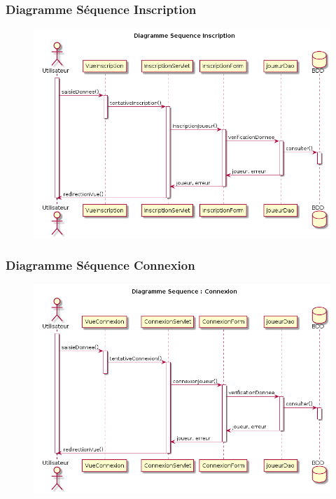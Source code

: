 \begin{frame}
    \frametitle{Diagramme Séquence Inscription}
    \begin{figure}
		\includegraphics[scale=0.3]{images/DiagrammeSequenceInscription.png}
	\end{figure}

\end{frame}

\begin{frame}
    \frametitle{Diagramme Séquence Connexion}
    \begin{figure}
		\includegraphics[scale=0.3]{images/DiagrammeSequenceConnexion.png}
	\end{figure}

\end{frame}

